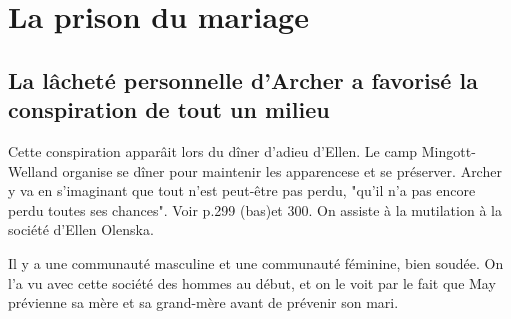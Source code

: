 \documentclass[a4paper,12pt]{article}
\begin{document}
\section{La prison du mariage}

\subsection{La lâcheté personnelle d'Archer a favorisé la conspiration de tout un milieu}

Cette conspiration apparâit lors du dîner d'adieu d'Ellen. Le camp Mingott-Welland organise se dîner pour maintenir les apparencese et se préserver. Archer y va en s'imaginant que tout n'est peut-être pas perdu, "qu'il n'a pas encore perdu toutes ses chances". Voir p.299 (bas)et 300. On assiste à la mutilation à la société d'Ellen Olenska.

Il y a une communauté masculine et une communauté féminine, bien soudée. On l'a vu avec cette société des hommes au début, et on le voit par le fait que May prévienne sa mère et sa grand-mère avant de prévenir son mari.
\end{document}
